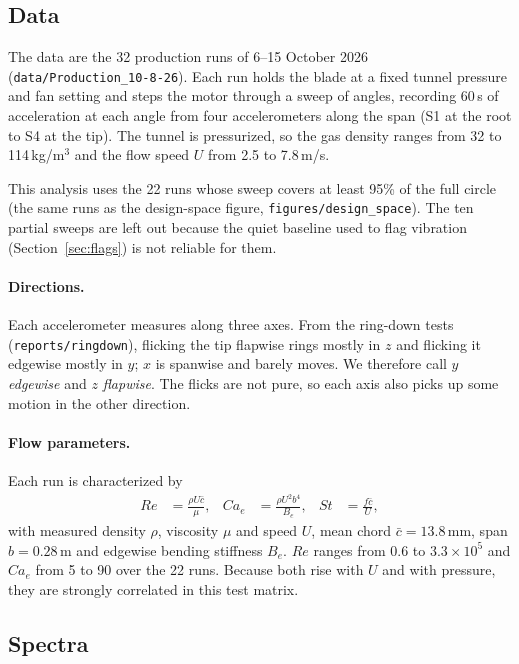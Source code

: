 \documentclass[11pt]{article}
\newcommand{\code}[1]{\texttt{#1}}
\begin{document}
\subsection{Data}

The data are the 32 production runs of 6--15 October 2026
(\code{data/Production\_10-8-26}). Each run holds the blade at a fixed tunnel
pressure and fan setting and steps the motor through a sweep of angles,
recording 60\,s of acceleration at each angle from four accelerometers along
the span (S1 at the root to S4 at the tip). The tunnel is pressurized, so the
gas density ranges from 32 to 114\,kg/m$^3$ and the flow speed $U$ from 2.5 to
7.8\,m/s.

This analysis uses the 22 runs whose sweep covers at least 95\% of the full
circle (the same runs as the design-space figure,
\code{figures/design\_space}). The ten partial sweeps are left out because the
quiet baseline used to flag vibration (Section~\ref{sec:flags}) is not
reliable for them.

\paragraph{Directions.} Each accelerometer measures along three axes. From the
ring-down tests (\code{reports/ringdown}), flicking the tip flapwise rings
mostly in $z$ and flicking it edgewise mostly in $y$; $x$ is spanwise and
barely moves. We therefore call $y$ \emph{edgewise} and $z$ \emph{flapwise}.
The flicks are not pure, so each axis also picks up some motion in the other
direction.

\paragraph{Flow parameters.} Each run is characterized by
\begin{align*}
  Re &= \frac{\rho U \bar{c}}{\mu}, &
  Ca_e &= \frac{\rho U^2 b^4}{B_e}, &
  St &= \frac{f \bar{c}}{U},
\end{align*}
with measured density $\rho$, viscosity $\mu$ and speed $U$, mean chord
$\bar{c} = 13.8$\,mm, span $b = 0.28$\,m and edgewise bending stiffness $B_e$.
$Re$ ranges from $0.6$ to $3.3\times10^5$ and $Ca_e$ from 5 to 90 over the 22
runs. Because both rise with $U$ and with pressure, they are strongly
correlated in this test matrix.

\subsection{Spectra}
\end{document}

